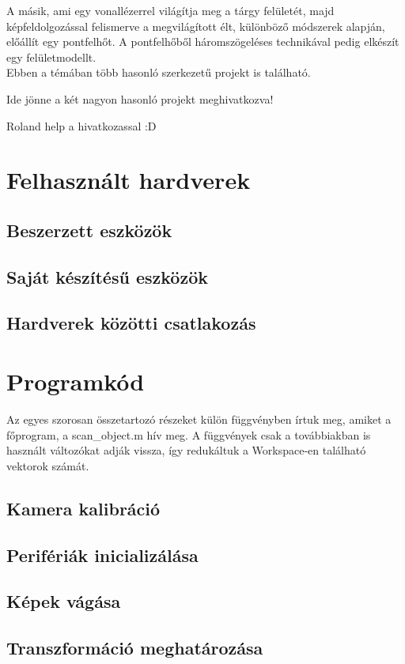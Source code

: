 \documentclass[12pt,a4paper]{article}
\begin{document}
	A másik, ami egy vonallézerrel világítja meg a tárgy felületét, majd képfeldolgozással felismerve a megvilágított élt, különböző módszerek alapján, előállít egy pontfelhőt. A pontfelhőből háromszögeléses technikával pedig elkészít egy felületmodellt.\\
	
	Ebben a témában több hasonló szerkezetű projekt is található.

	Ide jönne a két nagyon hasonló projekt meghivatkozva!



	Roland help a hivatkozassal :D
\section{Felhasznált hardverek}
\subsection{Beszerzett eszközök}
\subsection{Saját készítésű eszközök}
\subsection{Hardverek közötti csatlakozás}
\section{Programkód}
Az egyes szorosan összetartozó részeket külön függvényben írtuk meg, amiket a főprogram, a scan\_object.m hív meg. A függvények csak a továbbiakban is használt változókat adják vissza, így redukáltuk a Workspace-en található vektorok számát.
\subsection{Kamera kalibráció}
\subsection{Perifériák inicializálása}
\subsection{Képek vágása}
\subsection{Transzformáció meghatározása}
\end{document}
